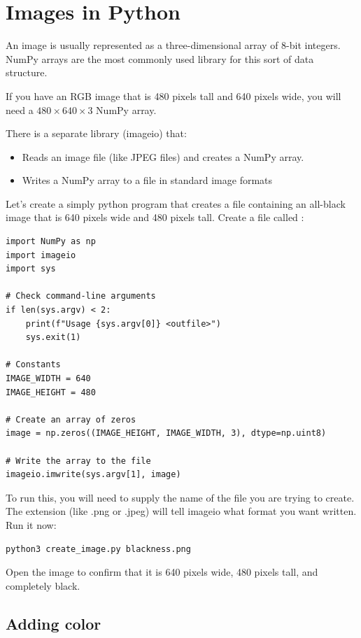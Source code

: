 \chapter{Images in Python}

An image is usually represented as a three-dimensional array of 8-bit
integers. NumPy arrays are the most commonly used library for this
sort of data structure.

If you have an RGB image that is 480 pixels tall and 640 pixels wide,
you will need a $480 \times 640 \times 3$ NumPy array.

There is a separate library (imageio) that:
\begin{itemize}
\item Reads an image file (like JPEG files) and creates a NumPy array.
\item Writes a NumPy array to a file in standard image formats
\end{itemize}

Let's create a simply python program that creates a file containing an
all-black image that is 640 pixels wide and 480 pixels tall. Create a
file called :

\begin{Verbatim}
import NumPy as np
import imageio
import sys

# Check command-line arguments
if len(sys.argv) < 2:
    print(f"Usage {sys.argv[0]} <outfile>")
    sys.exit(1)

# Constants
IMAGE_WIDTH = 640
IMAGE_HEIGHT = 480

# Create an array of zeros
image = np.zeros((IMAGE_HEIGHT, IMAGE_WIDTH, 3), dtype=np.uint8)

# Write the array to the file
imageio.imwrite(sys.argv[1], image)
\end{Verbatim}

To run this, you will need to supply the name of the file you are
trying to create. The extension (like .png or .jpeg) will tell imageio
what format you want written. Run it now:

\begin{Verbatim}
python3 create_image.py blackness.png
\end{Verbatim}

Open the image to confirm that it is 640 pixels wide, 480 pixels tall, and completely black.

\section{Adding color}

